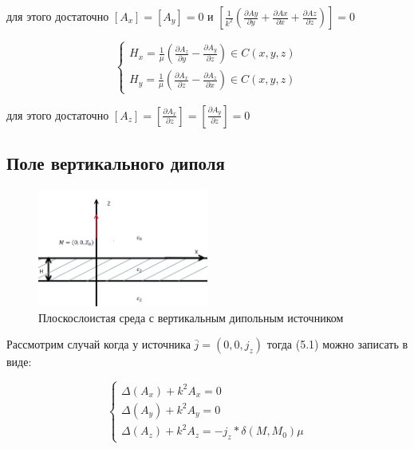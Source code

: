 	для этого достаточно $[A_x] = [A_y] = 0$ и $[\frac{1}{k^2}(\frac{\partial Ay}{\partial y} + \frac{\partial Ax}{\partial x} + \frac{\partial Az}{\partial z})] = 0$
	
	\begin{equation*}
		\tag{6.2} \begin{cases} H_x= \frac{1}{\mu} (\frac{\partial A_z}{\partial y} - \frac{\partial A_y}{\partial z}) \in C(x, y, z) \\   H_y= \frac{1}{\mu} (\frac{\partial A_x}{\partial z} - \frac{\partial A_z}{\partial x}) \in C(x, y, z)\end{cases} 
	\end{equation*}
	
	для этого достаточно $[{A_z}] = [\frac{\partial A_x}{\partial z}] = [\frac{\partial A_y}{\partial z}] = 0$
	
	\subsection{Поле вертикального диполя}
	
	\begin{figure}[h] %
		\centering %
		\includegraphics[width=0.5\textwidth]{Рис 2.PNG} %
		\caption{Плоскослоистая среда с вертикальным дипольным источником} %
		\label{fig:example2} %
	\end{figure}
	
	Рассмотрим случай когда у источника $\bar{j} = (0, 0, j_z)$ тогда (5.1) можно записать в виде:
	
	\begin{equation}
		\begin{cases}\Delta(A_x) + k^2 A_x = 0 \\ \Delta(A_y) + k^2 A_y = 0 \\ \Delta(A_z) + k^2 A_z = -j_z * \delta(M, M_0) \mu\end{cases}
	\end{equation}
	

